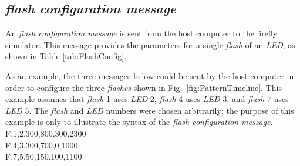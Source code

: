 \documentclass[letterpaper,11pt]{article}
\begin{document}
\subsection{\textit{flash configuration message}}

An \textit{flash configuration message} is sent from the host computer to the
firefly simulator. This message provides the parameters for a single
\textit{flash} of an \textit{LED}, as shown in Table \ref{tab:FlashConfig}.

As an example, the three messages below could be sent by the host computer in
order to configure the three \textit{flashes} shown in Fig.\
\ref{fig:PatternTimeline}. This example assumes that \textit{flash} 1 uses
\textit{LED} 2, \textit{flash} 4 uses \textit{LED} 3, and \textit{flash} 7 uses
\textit{LED} 5. The \textit{flash} and \textit{LED} numbers were chosen
arbitrarily; the purpose of this example is only to illustrate the syntax of
the \textit{flash configuration message}.\\[12pt]
{\ttfamily
F,1,2,300,800,300,2300\\
F,4,3,300,700,0,1000\\
F,7,5,50,150,100,1100\\
}
\end{document}
